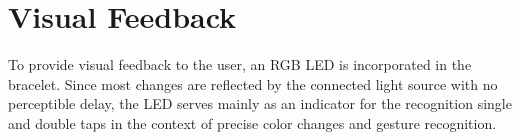 \section{Visual Feedback}
To provide visual feedback to the user, an \textsc{RGB} \ac{LED} is incorporated in the bracelet. Since most changes are reflected by the connected light source with no perceptible delay, the \ac{LED} serves mainly as an indicator for the recognition single and double taps in the context of precise color changes and gesture recognition.